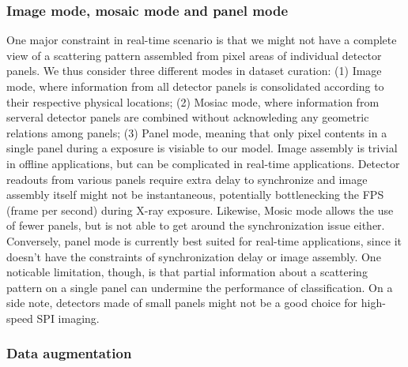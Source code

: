 \subsubsection{Image mode, mosaic mode and panel mode}

One major constraint in real-time scenario is that we might not have a complete
view of a scattering pattern assembled from pixel areas of individual detector
panels.  We thus consider three different modes in dataset curation: (1) Image
mode, where information from all detector panels is consolidated according to
their respective physical locations; (2) Mosiac mode, where information from
serveral detector panels are combined without acknowleding any geometric
relations among panels;  (3) Panel mode, meaning that only pixel contents in a
single panel during a exposure is visiable to our model.  Image assembly is
trivial in offline applications, but can be complicated in real-time
applications.  Detector readouts from various panels require extra delay to
synchronize and image assembly itself might not be instantaneous, potentially
bottlenecking the FPS (frame per second) during X-ray exposure. Likewise, Mosic
mode allows the use of fewer panels, but is not able to get around the
synchronization issue either.  Conversely, panel mode is currently best suited
for real-time applications, since it doesn't have the constraints of
synchronization delay or image assembly.  One noticable limitation, though, is
that partial information about a scattering pattern on a single panel can
undermine the performance of classification.  On a side note, detectors made of
small panels might not be a good choice for high-speed SPI imaging.  


\subsubsection{Data augmentation}


